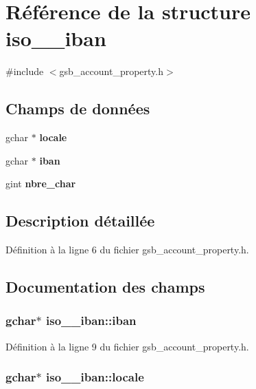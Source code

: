 \section{Référence de la structure iso\_\_\-iban}
\label{structiso__13616__iban}


{\ttfamily \#include $<$gsb\_\-account\_\-property.h$>$}

\subsection*{Champs de données}
\begin{DoxyCompactItemize}
\item 
gchar $\ast$ {\bf locale}
\item 
gchar $\ast$ {\bf iban}
\item 
gint {\bf nbre\_\-char}
\end{DoxyCompactItemize}


\subsection{Description détaillée}


Définition à la ligne 6 du fichier gsb\_\-account\_\-property.h.



\subsection{Documentation des champs}
\subsubsection[{iban}]{\setlength{\rightskip}{0pt plus 5cm}gchar$\ast$ {\bf iso\_\_\-iban::iban}}\label{structiso__13616__iban_a078a6634546fe62d4b8dcc529289a319}


Définition à la ligne 9 du fichier gsb\_\-account\_\-property.h.

\subsubsection[{locale}]{\setlength{\rightskip}{0pt plus 5cm}gchar$\ast$ {\bf iso\_\_\-iban::locale}}\label{structiso__13616__iban_a2288c1f4d316472bf93133e6308aa9e6}


